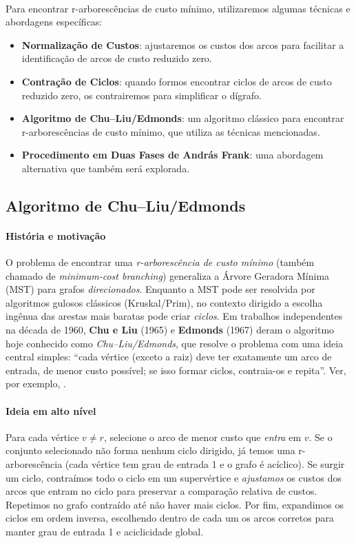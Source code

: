 \documentclass[12pt,a4paper]{article}
\begin{document}
\paragraph{}
Para encontrar r-arborescências de custo mínimo, utilizaremos algumas técnicas e abordagens específicas:
\begin{itemize}\setlength{\itemsep}{2pt}
    \item \textbf{Normalização de Custos}: ajustaremos os custos dos arcos para facilitar a identificação de arcos de custo reduzido zero.
    \item \textbf{Contração de Ciclos}: quando formos encontrar ciclos de arcos de custo reduzido zero, os contrairemos para simplificar o dígrafo.
    \item \textbf{Algoritmo de Chu–Liu/Edmonds}: um algoritmo clássico para encontrar r-arborescências de custo mínimo, que utiliza as técnicas mencionadas.
    \item \textbf{Procedimento em Duas Fases de András Frank}: uma abordagem alternativa que também será explorada.
\end{itemize}

\subsection{Algoritmo de Chu–Liu/Edmonds}

\paragraph{História e motivação}
O problema de encontrar uma \emph{r-arborescência de custo mínimo} (também chamado de \emph{minimum-cost branching}) generaliza a Árvore Geradora Mínima (MST) para grafos \emph{direcionados}. Enquanto a MST pode ser resolvida por algoritmos gulosos clássicos (Kruskal/Prim), no contexto dirigido a escolha ingênua das arestas mais baratas pode criar \emph{ciclos}. Em trabalhos independentes na década de 1960, \textbf{Chu e Liu} (1965) e \textbf{Edmonds} (1967) deram o algoritmo hoje conhecido como \emph{Chu–Liu/Edmonds}, que resolve o problema com uma ideia central simples: “cada vértice (exceto a raiz) deve ter exatamente um arco de entrada, de menor custo possível; se isso formar ciclos, contraia-os e repita”. Ver, por exemplo, \cite{schrijver2003comb}.

\paragraph{Ideia em alto nível}
Para cada vértice \(v\neq r\), selecione o arco de menor custo que \emph{entra} em \(v\). Se o conjunto selecionado não forma nenhum ciclo dirigido, já temos uma r-arborescência (cada vértice tem grau de entrada 1 e o grafo é acíclico). Se surgir um ciclo, contraímos todo o ciclo em um supervértice e \emph{ajustamos} os custos dos arcos que entram no ciclo para preservar a comparação relativa de custos. Repetimos no grafo contraído até não haver mais ciclos. Por fim, expandimos os ciclos em ordem inversa, escolhendo dentro de cada um os arcos corretos para manter grau de entrada 1 e aciclicidade global.
\end{document}
